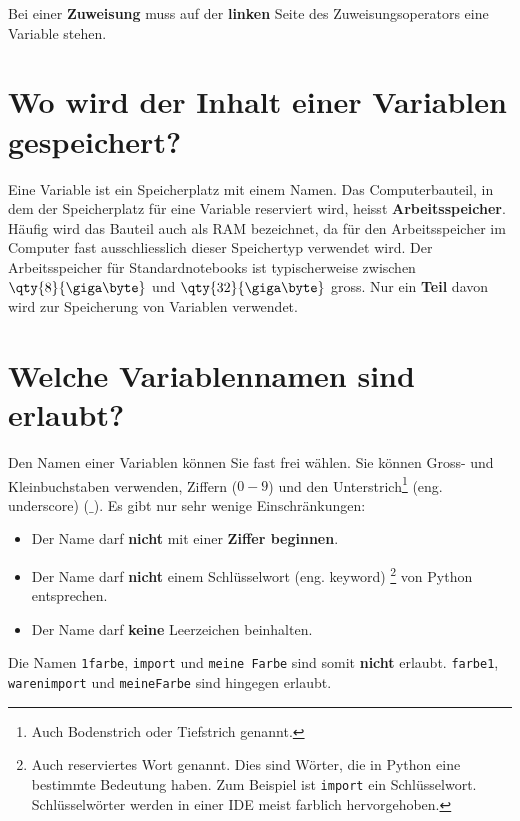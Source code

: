 \begin{important}
	Bei einer \textbf{Zuweisung} muss auf der \textbf{linken} Seite des Zuweisungsoperators eine Variable stehen.  
\end{important}

\section{Wo wird der Inhalt einer Variablen gespeichert?}

Eine Variable ist ein Speicherplatz mit einem Namen. Das Computerbauteil, in dem der Speicherplatz für eine Variable reserviert wird, heisst \textbf{Arbeitsspeicher}. Häufig wird das Bauteil auch als \ac{RAM} bezeichnet, da für den Arbeitsspeicher im Computer fast ausschliesslich dieser Speichertyp verwendet wird. Der Arbeitsspeicher für Standardnotebooks ist typischerweise zwischen $\qty{8}{\giga\byte}$ und $\qty{32}{\giga\byte}$ gross. Nur ein \textbf{Teil} davon wird zur Speicherung von Variablen verwendet. 

\section{Welche Variablennamen sind erlaubt?}

Den Namen einer Variablen können Sie fast frei wählen. Sie können Gross- und Kleinbuchstaben verwenden, Ziffern ($0-9$) und den Unterstrich\footnote{Auch Bodenstrich oder Tiefstrich genannt.} (eng. underscore) ($\_$). Es gibt nur sehr wenige Einschränkungen:

\begin{itemize}
\item Der Name darf \textbf{nicht} mit einer \textbf{Ziffer beginnen}.
\item Der Name darf \textbf{nicht} einem Schlüsselwort (eng. keyword) \footnote{Auch reserviertes Wort genannt. Dies sind Wörter, die in Python eine bestimmte Bedeutung haben. Zum Beispiel ist \lstinline{import} ein Schlüsselwort. Schlüsselwörter werden in einer \ac{IDE} meist farblich hervorgehoben.} von Python entsprechen.
\item Der Name darf \textbf{keine} Leerzeichen beinhalten.
\end{itemize}

Die Namen \lstinline{1farbe}, \lstinline{import} und \lstinline{meine Farbe} sind somit \textbf{nicht} erlaubt. \lstinline{farbe1}, \lstinline{warenimport} und \lstinline{meineFarbe} sind hingegen erlaubt.


